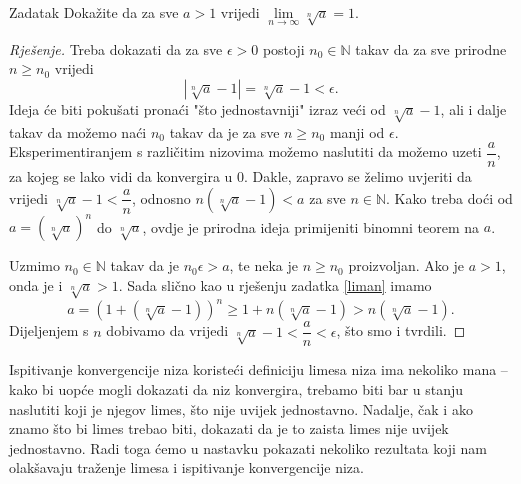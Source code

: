 \begin{exercise}{Zadatak}
Dokažite da za sve \(a>1\) vrijedi \(\lim\limits_{n\to \infty}{\sqrt[n]{a}}=1\).
\end{exercise}
\begin{proof}[Rješenje]
Treba dokazati da za sve \(\epsilon>0\) postoji \(n_0\in \mathbb{N}\) takav da za sve prirodne \(n\geq n_0\) vrijedi
\[|\sqrt[n]{a}-1|=\sqrt[n]{a}-1<\epsilon.\]
Ideja će biti pokušati pronaći "što jednostavniji" izraz veći od \(\sqrt[n]{a}-1\), ali i dalje takav da možemo naći \(n_0\) takav da je za sve \(n\geq n_0\) manji od \(\epsilon\). Eksperimentiranjem s različitim nizovima možemo naslutiti da možemo uzeti \(\dfrac{a}{n}\), za kojeg se lako vidi da konvergira u \(0\). Dakle, zapravo se želimo uvjeriti da vrijedi \(\sqrt[n]{a}-1<\dfrac{a}{n}\), odnosno \(n\left(\sqrt[n]{a}-1\right)<a\) za sve \(n\in \mathbb{N}\). Kako treba doći od \(a=\left(\sqrt[n]{a}\right)^n\) do \(\sqrt[n]{a}\), ovdje je prirodna ideja primijeniti binomni teorem na \(a\).

Uzmimo \(n_0\in \mathbb{N}\) takav da je \(n_0\epsilon>a\), te neka je \(n\geq n_0\) proizvoljan. Ako je \(a>1\), onda je i \(\sqrt[n]{a}>1\). Sada slično kao u rješenju zadatka \ref{liman} imamo
\[a=\left(1+(\sqrt[n]{a}-1)\right)^n\geq 1+n(\sqrt[n]{a}-1)>n(\sqrt[n]{a}-1).\]
Dijeljenjem s \(n\) dobivamo da vrijedi \(\sqrt[n]{a}-1<\dfrac{a}{n}<\epsilon\), što smo i tvrdili.
\end{proof}

Ispitivanje konvergencije niza koristeći definiciju limesa niza ima nekoliko mana -- kako bi uopće mogli dokazati da niz konvergira, trebamo biti bar u stanju naslutiti koji je njegov limes, što nije uvijek jednostavno. Nadalje, čak i ako znamo što bi limes trebao biti, dokazati da je to zaista limes nije uvijek jednostavno. Radi toga ćemo u nastavku pokazati nekoliko rezultata koji nam olakšavaju traženje limesa i ispitivanje konvergencije niza.

